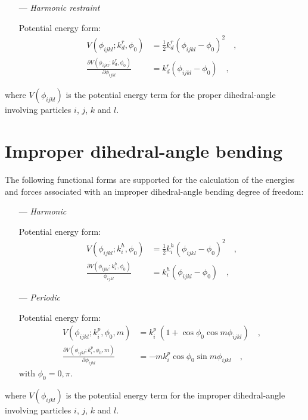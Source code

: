 \documentclass[10pt,a4paper]{report}
\numberwithin{equation}{section}
\begin{document}
\begin{itemize}
\item [---]\textit{Harmonic restraint}
  \par
  Potential energy form:
  \begin{align}
  \label{eq:proper-restraint-energy}
  V(\phi_{ijkl}; k_d^r, \phi_0) & = \frac{1}{2} k_d^r (\phi_{ijkl} - \phi_0)^2 \quad , \\ \nonumber
  \frac{\partial V(\phi_{ijkl}; k_d^r, \phi_0)}{\partial \phi_{ijkl}} & = k_d^r (\phi_{ijkl} - \phi_0) \quad , 
\end{align}
\end{itemize}
where $V(\phi_{ijkl})$ is the potential energy term for the proper dihedral-angle involving particles $i$, $j$, $k$ and $l$.

\section{Improper dihedral-angle bending}
\label{sec:improper-terms}

The following functional forms are supported for the calculation of
the energies and forces associated with an improper dihedral-angle
bending degree of freedom:\cite{GROMOS-doc,GROMACS-doc}

\begin{itemize}
\item[---] \textit{Harmonic}
  \par
  Potential energy form:  
\begin{align}
  \label{eq:improper-harmonic-energy}
  V(\phi_{ijkl}; k_i^h, \phi_0) & =  \frac{1}{2} k_i^h (\phi_{ijkl} - \phi_0)^2 \quad , \\ \nonumber
  \frac{\partial V(\phi_{ijkl}; k_i^h, \phi_0)}{\phi_{ijkl}} & = k_i^h (\phi_{ijkl} - \phi_0) \quad ,
\end{align}
\item [---] \textit{Periodic}
  \par
  Potential energy form:
  \begin{align}
    \label{eq:improper-periodic-energy}
    V(\phi_{ijkl} ; k_{i}^p, \phi_{0}, m) & = k_{i}^p\ (1 + \cos{\phi_{0}} \cos{m \phi_{ijkl}})\quad , \\ \nonumber
    \frac{\partial V(\phi_{ijkl} ; k_{i}^p, \phi_{0}, m)}{\partial \phi_{ijkl}} & = -m k_{i}^p \cos{\phi_{0}} \sin{m \phi_{ijkl}}\quad ,
  \end{align}
  with $\phi_{0}=0,\pi$.
 \end{itemize}
 where $V(\phi_{ijkl})$ is the potential energy term for the improper dihedral-angle involving particles $i$, $j$, $k$ and $l$.
\end{document}
